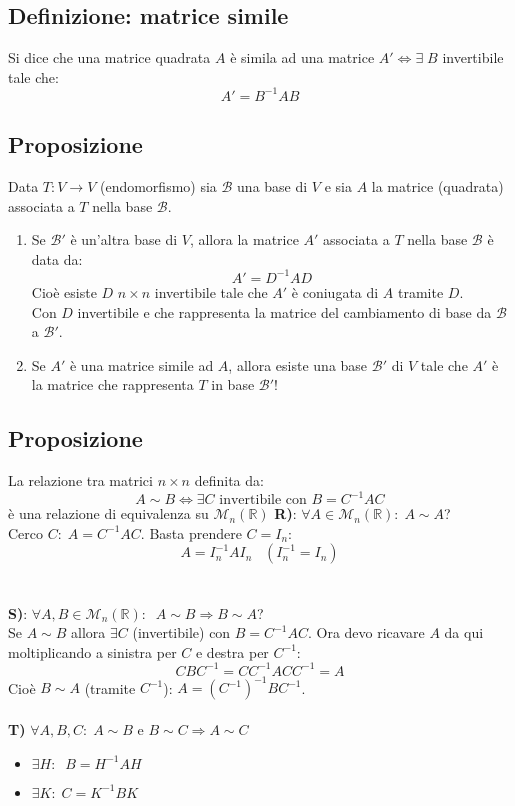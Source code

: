 \subsection{Definizione: matrice simile}
Si dice che una matrice quadrata $A$ è simila ad una matrice $A'\Leftrightarrow\exists\; B$ invertibile tale che:
\[A'=B^{-1}AB\]

\subsection{Proposizione}
Data $T:V\rightarrow V$ (endomorfismo) sia $\mathcal{B}$ una base di $V$ e sia $A$ la matrice (quadrata) associata a $T$ nella base $\mathcal{B}$.
\begin{enumerate}
\item Se $\mathcal{B}'$ è un'altra base di $V$, allora la matrice $A'$ associata a $T$ nella base $\mathcal{B}$ è data da:
  \[A'=D^{-1}AD\]
  Cioè esiste $D$ $n\times n$ invertibile tale che $A'$ è coniugata di $A$ tramite $D$.
  \\Con $D$ invertibile e che rappresenta la matrice del cambiamento di base da $\mathcal{B}$ a $\mathcal{B}'$.

\item Se $A'$ è una matrice simile ad $A$, allora esiste una base $\mathcal{B}'$ di $V$ tale che $A'$ è la matrice che rappresenta $T$ in base $\mathcal{B}'$!

\end{enumerate}

\subsection{Proposizione}
La relazione tra matrici $n\times n$ definita da:
\[A\sim B\Leftrightarrow\exists C\text{ invertibile con } B=C^{-1}AC\]
è una relazione di equivalenza su $\mathcal{M}_n(\mathbb{R})$
\textbf{R)}: $\forall A\in\mathcal{M}_n(\mathbb{R}):\;A\sim A$?
\\Cerco $C:\; A=C^{-1}AC$. Basta prendere $C=I_n$:
\[A=I^{-1}_nAI_n\;\;\;(I_n^{-1}=I_n)\]
\\\\\textbf{S)}: $\forall A,B\in\mathcal{M}_n(\mathbb{R}):\;\;A\sim B\Rightarrow B\sim A$?
\\Se $A\sim B$ allora $\exists C$ (invertibile) con $B=C^{-1}AC$. Ora devo ricavare $A$ da qui moltiplicando a sinistra per $C$ e destra per $C^{-1}$:
\[CBC^{-1}=CC^{-1}ACC^{-1}=A\]
Cioè $B\sim A$ (tramite $C^{-1}$): $A=(C^{-1})^{-1}BC^{-1}$.
\\\\\textbf{T)} $\forall A,B,C:\; A\sim B$ e $B\sim C\Rightarrow A\sim C$
\begin{itemize}

\item $\exists H:\;\; B=H^{-1}AH$

\item $\exists K:\; C=K^{-1}BK$

\end{itemize}

